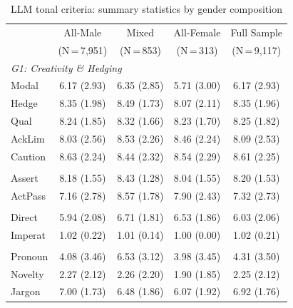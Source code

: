 \begin{table}[H]
    \footnotesize
    \centering
    \begin{threeparttable}
        \caption{LLM tonal criteria: summary statistics by gender composition}
        \label{tab:llm_summary}
        \begin{tabular}{p{3.5cm}cccc}
            \toprule
            & {All-Male} & {Mixed} & {All-Female} & {Full Sample} \\
            & {(N\,=\,7,951)} & {(N\,=\,853)} & {(N\,=\,313)} & {(N\,=\,9,117)} \\
            \midrule
            \multicolumn{5}{l}{\textit{G1: Creativity \& Hedging}} \\
            \quad Modal & 6.17 (2.93) & 6.35 (2.85) & 5.71 (3.00) & 6.17 (2.93) \\
            \quad Hedge & 8.35 (1.98) & 8.49 (1.73) & 8.07 (2.11) & 8.35 (1.96) \\
            \quad Qual & 8.24 (1.85) & 8.32 (1.66) & 8.23 (1.70) & 8.25 (1.82) \\
            \quad AckLim & 8.03 (2.56) & 8.53 (2.26) & 8.46 (2.24) & 8.09 (2.53) \\
            \quad Caution & 8.63 (2.24) & 8.44 (2.32) & 8.54 (2.29) & 8.61 (2.25) \\
            \addlinespace[4pt]
            \multicolumn{5}{l}{\textit{G2: Assertiveness \& Voice}} \\
            \quad Assert & 8.18 (1.55) & 8.43 (1.28) & 8.04 (1.55) & 8.20 (1.53) \\
            \quad ActPass & 7.16 (2.78) & 8.57 (1.78) & 7.90 (2.43) & 7.32 (2.73) \\
            \addlinespace[4pt]
            \multicolumn{5}{l}{\textit{G3: Structural Directness}} \\
            \quad Direct & 5.94 (2.08) & 6.71 (1.81) & 6.53 (1.86) & 6.03 (2.06) \\
            \quad Imperat & 1.02 (0.22) & 1.01 (0.14) & 1.00 (0.00) & 1.02 (0.21) \\
            \addlinespace[4pt]
            \multicolumn{5}{l}{\textit{G4: Authorial Stance \& Novelty}} \\
            \quad Pronoun & 4.08 (3.46) & 6.53 (3.12) & 3.98 (3.45) & 4.31 (3.50) \\
            \quad Novelty & 2.27 (2.12) & 2.26 (2.20) & 1.90 (1.85) & 2.25 (2.12) \\
            \quad Jargon & 7.00 (1.73) & 6.48 (1.86) & 6.07 (1.92) & 6.92 (1.76) \\

\end{tabular}
\end{threeparttable}
\end{table}
